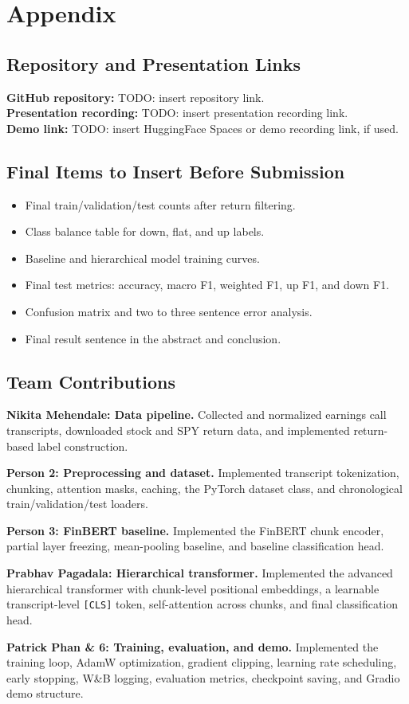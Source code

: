 \documentclass[11pt]{article}
\begin{document}
\newpage
\appendix
\section{Appendix}

\subsection{Repository and Presentation Links}
\textbf{GitHub repository:} TODO: insert repository link. \\
\textbf{Presentation recording:} TODO: insert presentation recording link. \\
\textbf{Demo link:} TODO: insert HuggingFace Spaces or demo recording link, if used.

\subsection{Final Items to Insert Before Submission}
\begin{itemize}
    \item Final train/validation/test counts after return filtering.
    \item Class balance table for down, flat, and up labels.
    \item Baseline and hierarchical model training curves.
    \item Final test metrics: accuracy, macro F1, weighted F1, up F1, and down F1.
    \item Confusion matrix and two to three sentence error analysis.
    \item Final result sentence in the abstract and conclusion.
\end{itemize}

\subsection{Team Contributions}

\textbf{Nikita Mehendale: Data pipeline.} Collected and normalized earnings call transcripts, downloaded stock and SPY return data, and implemented return-based label construction.

\textbf{Person 2: Preprocessing and dataset.} Implemented transcript tokenization, chunking, attention masks, caching, the PyTorch dataset class, and chronological train/validation/test loaders.

\textbf{Person 3: FinBERT baseline.} Implemented the FinBERT chunk encoder, partial layer freezing, mean-pooling baseline, and baseline classification head.

\textbf{Prabhav Pagadala: Hierarchical transformer.} Implemented the advanced hierarchical transformer with chunk-level positional embeddings, a learnable transcript-level \texttt{[CLS]} token, self-attention across chunks, and final classification head.

\textbf{Patrick Phan \& 6: Training, evaluation, and demo.} Implemented the training loop, AdamW optimization, gradient clipping, learning rate scheduling, early stopping, W\&B logging, evaluation metrics, checkpoint saving, and Gradio demo structure.
\end{document}
